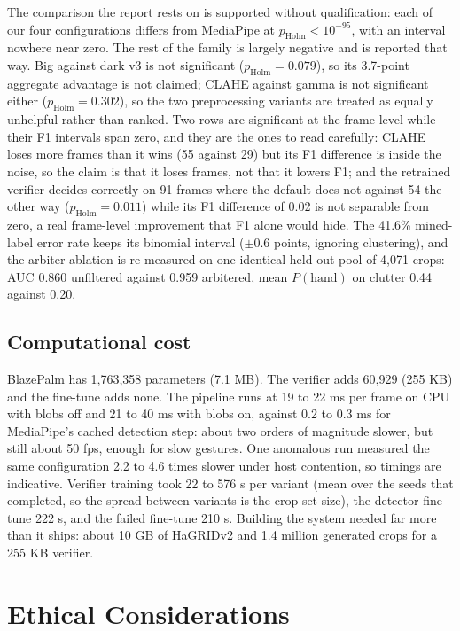 \documentclass[conference,a4paper]{IEEEtran}
\begin{document}
The comparison the report rests on is supported without qualification: each
of our four configurations differs from MediaPipe at
$p_{\text{Holm}}<10^{-95}$, with an interval nowhere near zero. The rest of
the family is largely negative and is reported that way. Big against dark v3
is not significant ($p_{\text{Holm}}=0.079$), so its 3.7-point aggregate
advantage is not claimed; CLAHE against gamma is not significant either
($p_{\text{Holm}}=0.302$), so the two preprocessing variants are treated as
equally unhelpful rather than ranked. Two rows are significant at the frame
level while their F1 intervals span zero, and they are the ones to read
carefully: CLAHE loses more frames than it wins (55 against 29) but its F1
difference is inside the noise, so the claim is that it loses frames, not
that it lowers F1; and the retrained verifier decides correctly on 91 frames
where the default does not against 54 the other way
($p_{\text{Holm}}=0.011$) while its F1 difference of 0.02 is not separable
from zero, a real frame-level improvement that F1 alone would hide. The
41.6\% mined-label error rate keeps its binomial interval ($\pm0.6$ points,
ignoring clustering), and the arbiter ablation is re-measured on one
identical held-out pool of 4{,}071 crops: AUC 0.860 unfiltered against 0.959
arbitered, mean $P(\text{hand})$ on clutter 0.44 against 0.20.

\subsection{Computational cost}
BlazePalm has 1,763,358 parameters (7.1 MB). The verifier adds 60,929 (255
KB) and the fine-tune adds none. The pipeline runs at 19 to 22 ms per frame
on CPU with blobs off and 21 to 40 ms with blobs on, against 0.2 to 0.3 ms
for MediaPipe's cached detection step: about two orders of magnitude
slower, but still about 50 fps, enough for slow gestures. One anomalous run
measured the same configuration 2.2 to 4.6 times slower under host
contention, so timings are indicative. Verifier training took 22 to 576 s
per variant (mean over the seeds that completed, so the spread between
variants is the crop-set size), the detector fine-tune 222 s, and the
failed fine-tune 210 s. Building the system needed far more
than it ships: about 10 GB of HaGRIDv2 and 1.4 million generated crops for
a 255 KB verifier.

\section{Ethical Considerations}
\label{sec:ethics}
\end{document}
